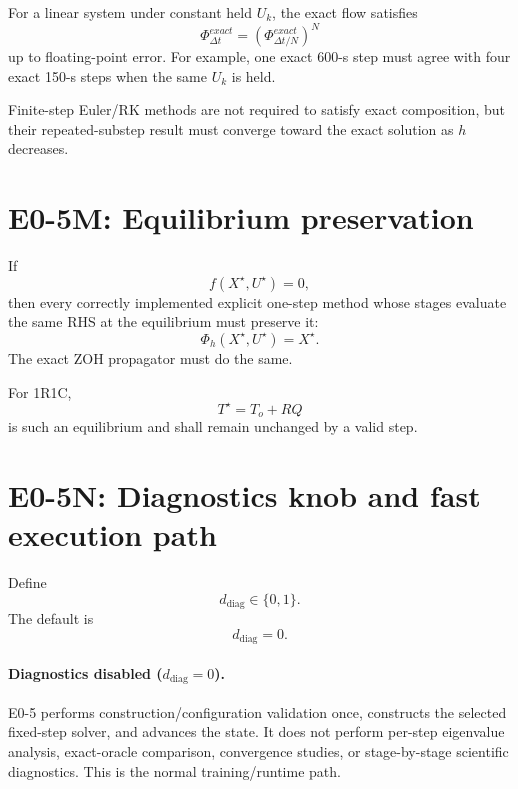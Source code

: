 \documentclass[11pt]{article}
\newcommand{\diagmode}{d_{\mathrm{diag}}}
\begin{document}
For a linear system under constant held $U_k$, the exact flow satisfies
\[
\boxed{
\Phi_{\Delta t}^{exact}
=
\left(\Phi_{\Delta t/N}^{exact}\right)^N
}
\]
up to floating-point error. For example, one exact 600-s step must agree with
four exact 150-s steps when the same $U_k$ is held.

Finite-step Euler/RK methods are not required to satisfy exact composition, but
their repeated-substep result must converge toward the exact solution as $h$
decreases.

\section{E0-5M: Equilibrium preservation}

If
\[
\boxed{f(X^\star,U^\star)=0,}
\]
then every correctly implemented explicit one-step method whose stages evaluate
the same RHS at the equilibrium must preserve it:
\[
\boxed{\Phi_h(X^\star,U^\star)=X^\star.}
\]
The exact ZOH propagator must do the same.

For 1R1C,
\[
T^\star=T_o+RQ
\]
is such an equilibrium and shall remain unchanged by a valid step.

\section{E0-5N: Diagnostics knob and fast execution path}

Define
\[
\boxed{
\diagmode\in\{0,1\}.
}
\]
The default is
\[
\boxed{\diagmode=0.}
\]

\paragraph{Diagnostics disabled ($\diagmode=0$).}
E0-5 performs construction/configuration validation once, constructs the selected
fixed-step solver, and advances the state. It does not perform per-step eigenvalue
analysis, exact-oracle comparison, convergence studies, or stage-by-stage
scientific diagnostics. This is the normal training/runtime path.
\end{document}
